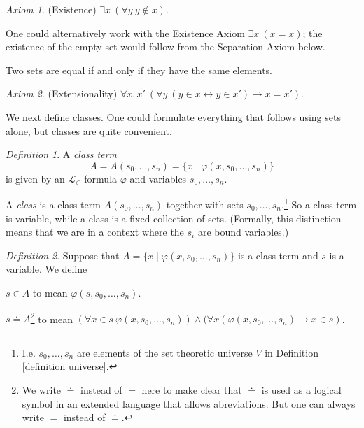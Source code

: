 \documentclass[a4paper, 11pt]{amsart}
\theoremstyle{remark}
\newtheorem{definition}[definition]{Definition}
\newtheorem*{axiom}{Axiom}
\newcommand{\cL}{\mathcal L}
\newenvironment{enumerate-(1)}{\begin{enumerate}[label={\upshape (\arabic*)}, leftmargin=2pc]}{\end{enumerate}}
\begin{document}
\begin{axiom}(Existence) 
$\exists x\ (\forall y\ y\notin x)$. 
\end{axiom} 

One could alternatively work with the Existence Axiom $\exists x\ (x=x)$; the existence of the empty set would follow from the Separation Axiom below. 

Two sets are equal if and only if they have the same elements. 

\begin{axiom}(Extensionality) 
$\forall x,x'\ (\forall y\ (y\in x\leftrightarrow y\in x') \rightarrow x=x')$. 
\end{axiom} 

We next define classes. 
One could formulate everything that follows using sets alone, but classes are quite convenient. 

\begin{definition} 
A \emph{class term} 
$$A=A(s_0,\dots,s_n)= \{x\mid \varphi(x,s_0,\dots,s_n)\}$$ is given by an $\cL_\in$-formula $\varphi$ and variables $s_0,\dots, s_n$. 

A \emph{class} is a class term $A(s_0,\dots,s_n)$ together with sets $s_0,\dots, s_n$.\footnote{I.e. $s_0,\dots,s_n$ are elements of the set theoretic universe $V$ in Definition \ref{definition universe}.} 
So a class term is variable, while a class is a fixed collection of sets. (Formally, this distinction means that we are in a context where the $s_i$ are bound variables.) 
\end{definition} 

\begin{definition} 
Suppose that $A= \{x\mid \varphi(x,s_0,\dots,s_n)\}$ is a class term and $s$ is a variable. We define 
\begin{enumerate-(1)} 
\item 
$s\in A$ to mean $\varphi(s,s_0,\dots,s_n)$. 
\item 
$s\doteq A$\footnote{We write $\doteq$ instead of $=$ here to make clear that $\doteq$ is used as a logical symbol in an extended language that allows abreviations. But one can always write $=$ instead of $\doteq$.}  to mean $(\forall x\in s\ \varphi(x,s_0,\dots,s_n)) \wedge(\forall x (\varphi(x,s_0,\dots,s_n) \rightarrow x\in s)$. 
\end{enumerate-(1)} 
\end{definition} 
\end{document}
